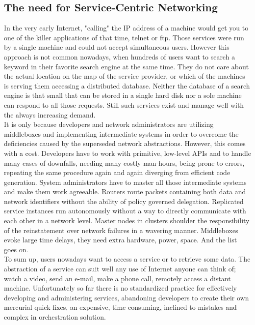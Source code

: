 \documentclass[12pt,a4paper,oneside]{article}
\begin{document}
\newpage
\subsection{The need for Service-Centric Networking}
In the very early Internet, "calling" the IP address of a machine would get you to one of the killer applications of that time, telnet or ftp. Those services were run by a single machine and could not accept simultaneous users. However this approach is not common nowadays, when hundreds of users want to search a keyword in their favorite search engine at the same time. They do not care about the actual location on the map of the service provider, or which of the machines is serving them accessing a distributed database. Neither the database of a search engine is that small that can be stored in a single hard disk nor a sole machine can respond to all those requests. Still such services exist and manage well with the always increasing demand. \\
\indent It is only because developers and network administrators are utilizing middleboxes and implementing intermediate systems in order to overcome the deficiencies caused by the superseded network abstractions. However, this comes with a cost. Developers have to work with primitive, low-level APIs and to handle many cases of downfalls, needing many costly man-hours, being prone to errors, repeating the same procedure again and again diverging from efficient code generation. System administrators have to master all those intermediate systems and make them work agreeable. Routers route packets containing both data and network identifiers without the ability of policy governed delegation. Replicated service instances run autonomously without a way to directly communicate with each other in a network level. Master nodes in clusters shoulder the responsibility of the reinstatement over network failures in a wavering manner. Middleboxes evoke large time delays, they need extra hardware, power, space. And the list goes on.\\
\indent To sum up, users nowadays want to access a service or to retrieve some data. The abstraction of a service can suit well any use of Internet anyone can think of; watch a video, send an e-mail, make a phone call, remotely access a distant machine. Unfortunately so far there is no standardized practice for effectively developing and administering services, abandoning developers to create their own mercurial quick fixes, an expensive, time consuming, inclined to mistakes and complex in orchestration solution.
\end{document}
